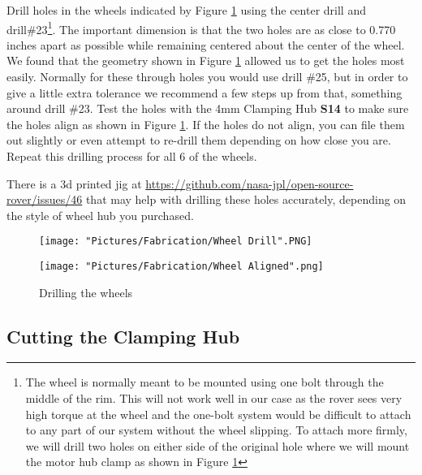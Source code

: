 \documentclass[12pt]{article}
\begin{document}
Drill holes in the wheels indicated by Figure \ref{Wheel drill} using the center drill and drill\#23\footnote{The wheel is normally meant to be mounted using one bolt through the middle of the rim. This will not work well in our case as the rover sees very high torque at the wheel and the one-bolt system would be difficult to attach to any part of our system without the wheel slipping. To attach more firmly, we will drill two holes on either side of the original hole where we will mount the motor hub clamp as shown in Figure \ref{Wheel drill}}. The important dimension is that the two holes are as close to 0.770 inches apart as possible while remaining centered about the center of the wheel. We found that the geometry shown in Figure \ref{Wheel drill} allowed us to get the holes most easily. Normally for these through holes you would use drill \#25, but in order to give a little extra tolerance we recommend a few steps up from that, something around drill \#23. Test the holes with the 4mm Clamping Hub \textbf{S14} to make sure the holes align as shown in Figure \ref{Wheel drill}. If the holes do not align, you can file them out slightly or even attempt to re-drill them depending on how close you are. Repeat this drilling process for all 6 of the wheels.

There is a 3d printed jig at \href{https://github.com/nasa-jpl/open-source-rover/issues/46}{https://github.com/nasa-jpl/open-source-rover/issues/46} that may help with drilling these holes accurately, depending on the style of wheel hub you purchased. 




\begin{figure}[H]
  \centering
  \begin{minipage}[b]{0.45\textwidth}
    \texttt{[image: "Pictures/Fabrication/Wheel Drill".PNG]}
  \end{minipage}
  \hfill
  \begin{minipage}[b]{0.45\textwidth}
    \texttt{[image: "Pictures/Fabrication/Wheel Aligned".png]}
  \end{minipage}
  \caption{Drilling the wheels}
  \label{Wheel drill}
\end{figure}


\subsection{Cutting the Clamping Hub}
\end{document}
